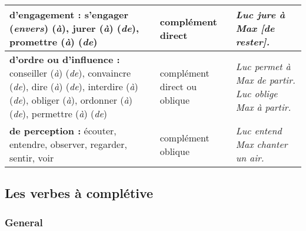 \documentclass[UTF8]{report}
\begin{document}
\begin{table}[H]
\begin{adjustbox}{max width=\textwidth}
\begin{tabular}{| L{6.8cm} | L{2.5cm} | L{5.5cm} |}
        \hline
        \textbf{d’engagement :} \newline s’engager (\textit{envers}) (\textit{à}), jurer (\textit{à}) (\textit{de}), promettre (\textit{à}) (\textit{de}) & complément direct & \textit{Luc jure à Max [de rester].} \\
        \hline
        \textbf{d’ordre ou d’influence :} \newline conseiller (\textit{à}) (\textit{de}), convaincre (\textit{de}), dire (\textit{à}) (\textit{de}), interdire (\textit{à}) (\textit{de}), obliger (\textit{à}), ordonner (\textit{à}) (\textit{de}), permettre (\textit{à}) (\textit{de}) & complément direct ou oblique & \textit{Luc permet à Max de partir.} \newline \textit{Luc oblige Max à partir.} \\
        \hline
        \textbf{de perception :} \newline écouter, entendre, observer, regarder, sentir, voir & complément oblique & \textit{Luc entend Max chanter un air.} \\
        \hline
        \end{tabular}
    \end{adjustbox}
\end{table}


\newpage
\subsection{Les verbes à complétive}

\subsubsection{General}
\end{document}
